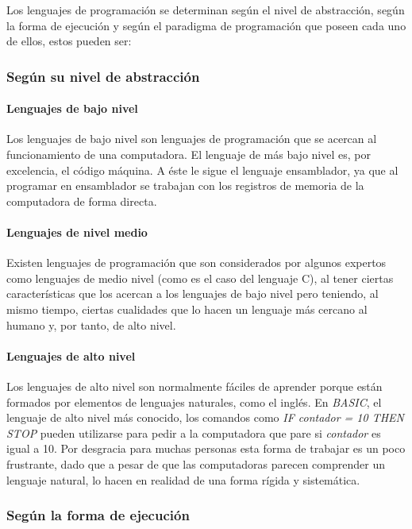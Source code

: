 \documentclass[12pt,legalpaper]{report}
\begin{document}
Los lenguajes de programación se determinan según el nivel de abstracción, según la forma de ejecución y según el paradigma de programación que poseen cada uno de ellos, estos pueden ser:

			\subsubsection{Según su nivel de abstracción}

				\paragraph{Lenguajes de bajo nivel}

Los lenguajes de bajo nivel son lenguajes de programación que se acercan al funcionamiento de una computadora. El lenguaje de más bajo nivel es, por excelencia, el código máquina. A éste le sigue el lenguaje ensamblador, ya que al programar en ensamblador se trabajan con los registros de memoria de la computadora de forma directa.

				\paragraph{Lenguajes de nivel medio}

Existen lenguajes de programación que son considerados por algunos expertos como lenguajes de medio nivel (como es el caso del lenguaje C), al tener ciertas características que los acercan a los lenguajes de bajo nivel pero teniendo, al mismo tiempo, ciertas cualidades que lo hacen un lenguaje más cercano al humano y, por tanto, de alto nivel.

				\paragraph{Lenguajes de alto nivel}

Los lenguajes de alto nivel son normalmente fáciles de aprender porque están formados por elementos de lenguajes naturales, como el inglés. En \textit{BASIC}, el lenguaje de alto nivel más conocido, los comandos como \textit{IF contador = 10 THEN STOP} pueden utilizarse para pedir a la computadora que pare si \textit{contador} es igual a 10. Por desgracia para muchas personas esta forma de trabajar es un poco frustrante, dado que a pesar de que las computadoras parecen comprender un lenguaje natural, lo hacen en realidad de una forma rígida y sistemática.


			\subsubsection{Según la forma de ejecución}
\end{document}
